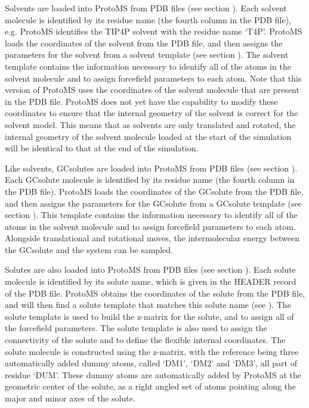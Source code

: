 \documentclass[letterpaper,10pt,english]{sphinxmanual}
\begin{document}
Solvents are loaded into ProtoMS from PDB files (see section {\hyperref[\detokenize{protoms:solventpdb}]{}}). Each solvent molecule is identified by its residue name (the fourth column in the PDB file), e.g. ProtoMS identifies the TIP4P solvent with the residue name ‘T4P’. ProtoMS loads the coordinates of the solvent from the PDB file, and then assigns the parameters for the solvent from a solvent template (see section {\hyperref[\detokenize{protoms:temref}]{}}). The solvent template contains the information necessary to identify all of the atoms in the solvent molecule and to assign forcefield parameters to each atom. Note that this version of ProtoMS uses the coordinates of the solvent molecule that are present in the PDB file. ProtoMS does not yet have the capability to modify these coordinates to ensure that the internal geometry of the solvent is correct for the solvent model. This means that as solvents are only translated and rotated, the internal geometry of
the solvent molecule loaded at the start of the simulation will be identical to that at the end of the simulation.

\ignorespaces 
{}

Like solvents, GCsolutes are loaded into ProtoMS from PDB files (see section {\hyperref[\detokenize{protoms:gcpdb}]{}}). Each GCsolute molecule is identified by its residue name (the fourth column in the PDB file). ProtoMS loads the coordinates of the GCsolute from the PDB file, and then assigns the parameters for the GCsolute from a GCsolute template (see section {\hyperref[\detokenize{protoms:temref}]{}}). This template contains the information necessary to identify all of the atoms in the solvent molecule and to assign forcefield parameters to each atom. Alongside translational and rotational moves, the intermolecular energy between the GCsolute and the system can be sampled.

\ignorespaces 
{}

Solutes are also loaded into ProtoMS from PDB files (see section {\hyperref[\detokenize{protoms:solpdb}]{}}). Each solute molecule is identified by its solute name, which is given in the HEADER record of the PDB file. ProtoMS obtains the coordinates of the solute from the PDB file, and will then find a solute template that matches this solute name (see {\hyperref[\detokenize{protoms:temref}]{}}). The solute template is used to build the z-matrix for the solute, and to assign all of the forcefield parameters. The solute template is also used to assign the connectivity of the solute and to define the flexible internal coordinates. The solute molecule is constructed using the z-matrix, with the reference being three automatically added dummy atoms, called ‘DM1’, ‘DM2’ and ‘DM3’, all part of residue ‘DUM’. These dummy atoms are automatically added by ProtoMS at the geometric center of the solute, as a right angled set of atoms pointing along the major and minor axes of the solute.
\end{document}
